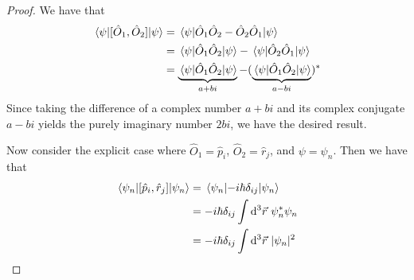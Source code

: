 \documentclass[../psets.tex]{subfiles}
\begin{document}
\begin{enumerate}
\begin{enumerate}
\begin{proof}
            We have that
            \begin{align*}
                \ev{[\hat{O}_1,\hat{O}_2]}{\psi} &= \ev{\hat{O}_1\hat{O}_2-\hat{O}_2\hat{O}_1}{\psi}\\
                &= \ev{\hat{O}_1\hat{O}_2}{\psi}-\ev{\hat{O}_2\hat{O}_1}{\psi}\\
                &= \underbrace{\ev{\hat{O}_1\hat{O}_2}{\psi}}_{a+bi}-(\underbrace{\ev{\hat{O}_1\hat{O}_2}{\psi}}_{a-bi})^*
            \end{align*}
            Since taking the difference of a complex number $a+bi$ and its complex conjugate $a-bi$ yields the purely imaginary number $2bi$, we have the desired result.\par
            Now consider the explicit case where $\hat{O}_1=\hat{p}_i$, $\hat{O}_2=\hat{r}_j$, and $\psi=\psi_n$. Then we have that
            \begin{align*}
                \ev{[\hat{p}_i,\hat{r}_j]}{\psi_n} &= \ev{-i\hbar\delta_{ij}}{\psi_n}\\
                &= -i\hbar\delta_{ij}\int\dd^3\vec{r}\ \psi_n^*\psi_n\\
                &= -i\hbar\delta_{ij}\int\dd^3\vec{r}\ |\psi_n|^2
            \end{align*}

\end{proof}
\end{enumerate}
\end{enumerate}
\end{document}
